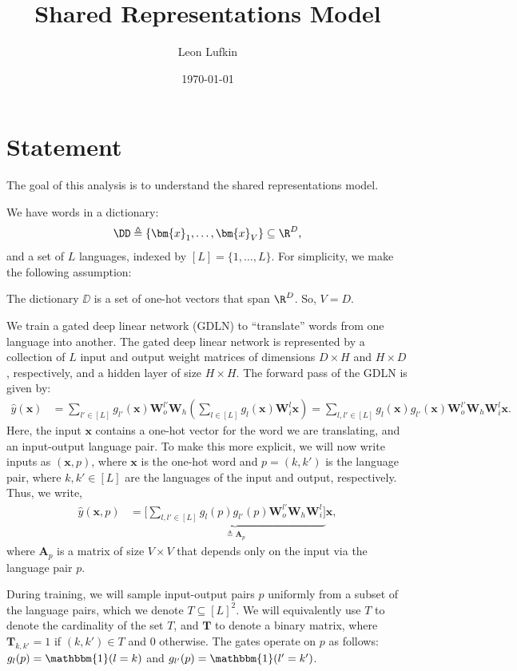 \documentclass{article}
\title{Shared Representations Model}
\author{Leon Lufkin}
\date{\today}
\begin{document}
\section{Statement}
The goal of this analysis is to understand the shared representations model.

We have words in a dictionary:
\begin{align*}
    \DD \triangleq \{ \bm{x}_1, \ldots, \bm{x}_V \} \subseteq \R^D,
\end{align*}
and a set of $L$ languages, indexed by $[L] = \{ 1, \ldots, L \}$.
For simplicity, we make the following assumption:
\begin{assumption} \label{assumption:one-hot}
    The dictionary $\DD$ is a set of one-hot vectors that span $\R^D$.
    So, $V = D$.
\end{assumption}

We train a gated deep linear network (GDLN) to ``translate'' words from one language into another.
The gated deep linear network is represented by a collection of $L$ input and output weight matrices of dimensions $D \times H$ and $H \times D$, respectively, and a hidden layer of size $H \times H$.
The forward pass of the GDLN is given by:
\begin{align*}
    \hat{y}(\bm{x})
    &= \sum_{l' \in [L]} g_{l'}(\bm{x}) \bm{W}_o^{l'} \bm{W}_h \left( \sum_{l \in [L]} g_l(\bm{x}) \bm{W}_i^l \bm{x} \right) 
    = \sum_{l,l' \in [L]} g_l(\bm{x}) g_{l'}(\bm{x}) \bm{W}_o^{l'} \bm{W}_h \bm{W}_i^l \bm{x}.
\end{align*}
Here, the input $\bm{x}$ contains a one-hot vector for the word we are translating, and an input-output language pair.
To make this more explicit, we will now write inputs as $(\bm{x}, p)$, where $\bm{x}$ is the one-hot word and $p = (k, k')$ is the language pair, where $k,k' \in [L]$ are the languages of the input and output, respectively.
Thus, we write,
\begin{align*}
    \hat{y}(\bm{x}, p)
    &= \underbrace{ \Bigg[ \sum_{l,l' \in [L]} g_l(p) g_{l'}(p) \bm{W}_o^{l'} \bm{W}_h \bm{W}_i^l \Bigg] }_{\triangleq \bm{A}_{p}} \bm{x},
\end{align*}
where $\bm{A}_{p}$ is a matrix of size $V \times V$ that depends only on the input via the language pair $p$.

During training, we will sample input-output pairs $p$ uniformly from a subset of the language pairs, which we denote $T \subseteq [L]^2$.
We will equivalently use $T$ to denote the cardinality of the set $T$, and $\bm{T}$ to denote a binary matrix, where $\bm{T}_{k,k'} = 1$ if $(k,k') \in T$ and $0$ otherwise.
The gates operate on $p$ as follows: $g_l(p) = \mathbbm{1}(l = k)$ and $g_{l'}(p) = \mathbbm{1}(l' = k')$.
\end{document}
